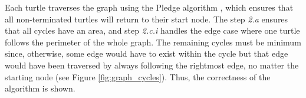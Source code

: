 Each turtle traverses the graph using the Pledge algorithm \cite{turtle_geometry}, which ensures that all non-terminated turtles will return to their start node.
The step \textit{2.a} ensures that all cycles have an area, and step \textit{2.c.i} handles the edge case where one turtle follows the perimeter of the whole graph.
The remaining cycles must be minimum since, otherwise, some edge would have to exist within the cycle but that edge would have been traversed by always following the rightmost edge, no matter the starting node (see Figure \ref{fig:graph_cycles}).
Thus, the correctness of the algorithm is shown.

